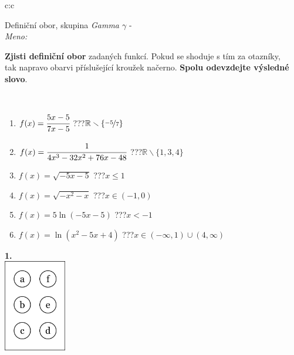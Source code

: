 \documentclass[10pt]{report}
\begin{document}
\begin{tabular}{c:c}
\begin{minipage}[c][104.5mm][t]{0.5\linewidth}
\begin{center}
\vspace{7mm}
{\huge Definiční obor, skupina \textit{Gamma $\gamma$} -}\\[5mm]
\textit{Meno:}\phantom{xxxxxxxxxxxxxxxxxxxxxxxxxxxxxxxxxxxxxxxxxxxxxxxxxxxxxxxxxxxxxxxxx}\\[5mm]
\begin{minipage}{0.95\linewidth}
\textbf{Zjisti definiční obor} zadaných funkcí. Pokud se shoduje s tím za otazníky,\\tak napravo obarvi příslušející kroužek načerno. \textbf{Spolu odevzdejte výsledné slovo}.
\end{minipage}
\\[1mm]
\begin{minipage}{0.79\linewidth}
\begin{center}
\begin{varwidth}{\linewidth}
\begin{enumerate}
\normalsizerrr
\item $f(x)=\cfrac{5x-5}{7x-5}$\quad \dotfill\; ???\;\dotfill \quad $\mathbb{R}\smallsetminus\{\nicefrac{-5}{7}\}$
\item $f(x)=\cfrac{1}{4x^3-32x^2+76x-48}$\quad \dotfill\; ???\;\dotfill \quad $\mathbb{R}\smallsetminus\{1,3,4\}$
\item $f(x)=\sqrt{-5x-5}$\quad \dotfill\; ???\;\dotfill \quad $x\leq1$
\item $f(x)=\sqrt{-x^2-x}$\quad \dotfill\; ???\;\dotfill \quad $x\in(-1 , 0)$
\item $f(x)=5\ln{(-5x-5)}$\quad \dotfill\; ???\;\dotfill \quad $x<-1$
\item $f(x)=\ln{(x^2-5x+4)}$\quad \dotfill\; ???\;\dotfill \quad $x\in(-\infty , 1)\cup(4 , \infty)$
\end{enumerate}
\end{varwidth}
\end{center}
\end{minipage}
\begin{minipage}{0.20\linewidth}
\begin{center}
{\Huge\bfseries 1.} \\[2mm]
\includegraphics[height=40mm]{../images/braille.png}

\end{center}
\end{minipage}
\end{center}
\end{minipage}
\end{tabular}
\end{document}
